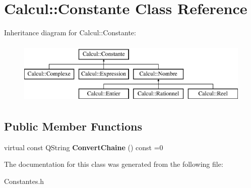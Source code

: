 \hypertarget{class_calcul_1_1_constante}{\section{Calcul\-:\-:Constante Class Reference}
\label{class_calcul_1_1_constante}
}
Inheritance diagram for Calcul\-:\-:Constante\-:\begin{figure}[H]
\begin{center}
\leavevmode
\includegraphics[height=3.000000cm]{class_calcul_1_1_constante}
\end{center}
\end{figure}
\subsection*{Public Member Functions}
\begin{DoxyCompactItemize}
\item 
\hypertarget{class_calcul_1_1_constante_a80fb461841b16e6d5d1339802b69858e}{virtual const Q\-String {\bfseries Convert\-Chaine} () const =0}\label{class_calcul_1_1_constante_a80fb461841b16e6d5d1339802b69858e}

\end{DoxyCompactItemize}


The documentation for this class was generated from the following file\-:\begin{DoxyCompactItemize}
\item 
Constantes.\-h\end{DoxyCompactItemize}
